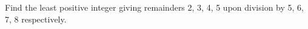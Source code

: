 Find the least positive integer giving remainders 2, 3, 4, 5 upon division by 5, 6, 7, 8 respectively.
